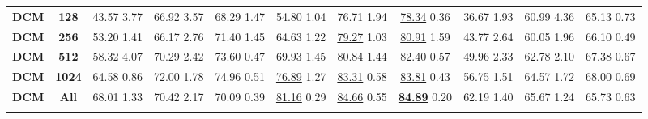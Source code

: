 \documentclass{article}
\begin{document}
\begin{table*}
\begin{tabular}{l|c|ccc|ccc|ccc}
    \textbf{DCM} & \textbf{128}
    & 43.57 {\tiny 3.77} & 66.92 {\tiny 3.57} & 68.29 {\tiny 1.47} 
    & 54.80 {\tiny 1.04} & 76.71 {\tiny 1.94} & \underline{78.34} {\tiny 0.36} 
    & 36.67 {\tiny 1.93} & 60.99 {\tiny 4.36} & 65.13 {\tiny 0.73} \\
    
    \textbf{DCM} & \textbf{256}   
    & 53.20 {\tiny 1.41} & 66.17 {\tiny 2.76} & 71.40 {\tiny 1.45} 
    & 64.63 {\tiny 1.22} & \underline{79.27} {\tiny 1.03} & \underline{80.91} {\tiny 1.59} 
    & 43.77 {\tiny 2.64} & 60.05 {\tiny 1.96} & 66.10 {\tiny 0.49} \\
    
    \textbf{DCM} & \textbf{512}   
    & 58.32 {\tiny 4.07} & 70.29 {\tiny 2.42} & 73.60 {\tiny 0.47} 
    & 69.93 {\tiny 1.45} & \underline{80.84} {\tiny 1.44} & \underline{82.40} {\tiny 0.57} 
    & 49.96 {\tiny 2.33} & 62.78 {\tiny 2.10} & 67.38 {\tiny 0.67} \\
    
    \textbf{DCM} & \textbf{1024}   
    & 64.58 {\tiny 0.86} & 72.00 {\tiny 1.78} & 74.96 {\tiny 0.51} 
    & \underline{76.89} {\tiny 1.27} 
    & \underline{83.31} {\tiny 0.58} 
    & \underline{83.81} {\tiny 0.43} 
    & 56.75 {\tiny 1.51} & 64.57 {\tiny 1.72} & 68.00 {\tiny 0.69} \\

    \textbf{DCM} & \textbf{All}
    & 68.01 {\tiny 1.33} & {70.42} {\tiny 2.17} & 70.09 {\tiny 0.39}	
    & \underline{81.16} {\tiny 0.29} 
    & \underline{84.66} {\tiny 0.55} 
    & \underline{\textbf{84.89}} {\tiny 0.20}
    & 62.19 {\tiny 1.40} & 65.67 {\tiny 1.24} & 65.73 {\tiny 0.63} \\

    \noalign{\smallskip}
    \hline
    \noalign{\smallskip}
    

\end{tabular}
\end{table*}
\end{document}
